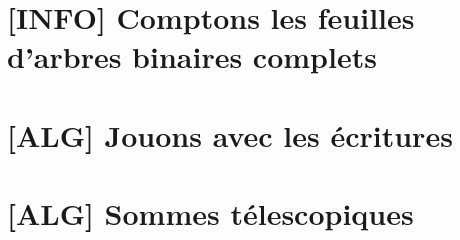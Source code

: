 \section{[INFO] Comptons les feuilles d'arbres binaires complets} \label{power-q:p-ary-tree}

	


\newpage
\section{[ALG] Jouons avec les écritures} \label{power-q:rewriting}

	


\section{[ALG] Sommes télescopiques} \label{power-q:telescopic}

	
